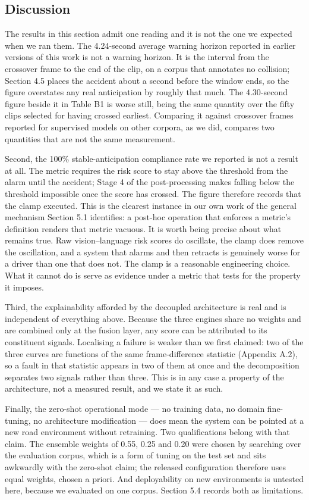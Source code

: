 \subsection{Discussion}
The results in this section admit one reading and it is not the one we expected when we ran them. The 4.24-second average warning horizon reported in earlier versions of this work is not a warning horizon. It is the interval from the crossover frame to the end of the clip, on a corpus that annotates no collision; Section 4.5 places the accident about a second before the window ends, so the figure overstates any real anticipation by roughly that much. The 4.30-second figure beside it in Table B1 is worse still, being the same quantity over the fifty clips selected for having crossed earliest. Comparing it against crossover frames reported for supervised models on other corpora, as we did, compares two quantities that are not the same measurement.

Second, the 100\% stable-anticipation compliance rate we reported is not a result at all. The metric requires the risk score to stay above the threshold from the alarm until the accident; Stage 4 of the post-processing makes falling below the threshold impossible once the score has crossed. The figure therefore records that the clamp executed. This is the clearest instance in our own work of the general mechanism Section 5.1 identifies: a post-hoc operation that enforces a metric's definition renders that metric vacuous. It is worth being precise about what remains true. Raw vision--language risk scores do oscillate, the clamp does remove the oscillation, and a system that alarms and then retracts is genuinely worse for a driver than one that does not. The clamp is a reasonable engineering choice. What it cannot do is serve as evidence under a metric that tests for the property it imposes.

Third, the explainability afforded by the decoupled architecture is real and is independent of everything above. Because the three engines share no weights and are combined only at the fusion layer, any score can be attributed to its constituent signals. Localising a failure is weaker than we first claimed: two of the three curves are functions of the same frame-difference statistic (Appendix A.2), so a fault in that statistic appears in two of them at once and the decomposition separates two signals rather than three. This is in any case a property of the architecture, not a measured result, and we state it as such.

Finally, the zero-shot operational mode --- no training data, no domain fine-tuning, no architecture modification --- does mean the system can be pointed at a new road environment without retraining. Two qualifications belong with that claim. The ensemble weights of 0.55, 0.25 and 0.20 were chosen by searching over the evaluation corpus, which is a form of tuning on the test set and sits awkwardly with the zero-shot claim; the released configuration therefore uses equal weights, chosen a priori. And deployability on new environments is untested here, because we evaluated on one corpus. Section 5.4 records both as limitations.

